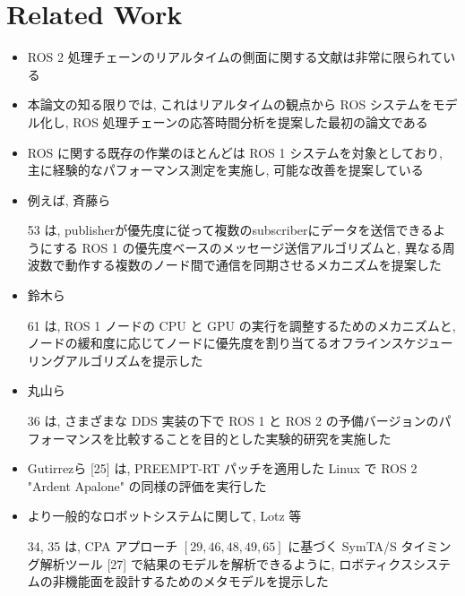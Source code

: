 
\section{Related Work}
\label{sec: related work}

\begin{frame}{}
    \begin{itemize}
        \item ROS 2 処理チェーンのリアルタイムの側面に関する文献は非常に限られている
\item 本論文の知る限りでは, これはリアルタイムの観点から ROS システムをモデル化し, ROS 処理チェーンの応答時間分析を提案した最初の論文である
    \end{itemize}
\end{frame}

\begin{frame}{}
    \begin{itemize}
        \item ROS に関する既存の作業のほとんどは ROS 1 システムを対象としており, 主に経験的なパフォーマンス測定を実施し, 可能な改善を提案している
\item 例えば, 斉藤ら
\item [53] は, publisherが優先度に従って複数のsubscriberにデータを送信できるようにする ROS 1 の優先度ベースのメッセージ送信アルゴリズムと, 異なる周波数で動作する複数のノード間で通信を同期させるメカニズムを提案した
\item 鈴木ら
\item [61] は, ROS 1 ノードの CPU と GPU の実行を調整するためのメカニズムと, ノードの緩和度に応じてノードに優先度を割り当てるオフラインスケジューリングアルゴリズムを提示した
\item 丸山ら
\item [36] は, さまざまな DDS 実装の下で ROS 1 と ROS 2 の予備バージョンのパフォーマンスを比較することを目的とした実験的研究を実施した
\item Gutirrezら [25] は, PREEMPT-RT パッチを適用した Linux で ROS 2 "Ardent Apalone" の同様の評価を実行した
\item より一般的なロボットシステムに関して, Lotz 等
\item [34, 35] は, CPA アプローチ $[29,46,48,49,65]$ に基づく SymTA/S タイミング解析ツール [27] で結果のモデルを解析できるように, ロボティクスシステムの非機能面を設計するためのメタモデルを提示した
    \end{itemize}
\end{frame}

